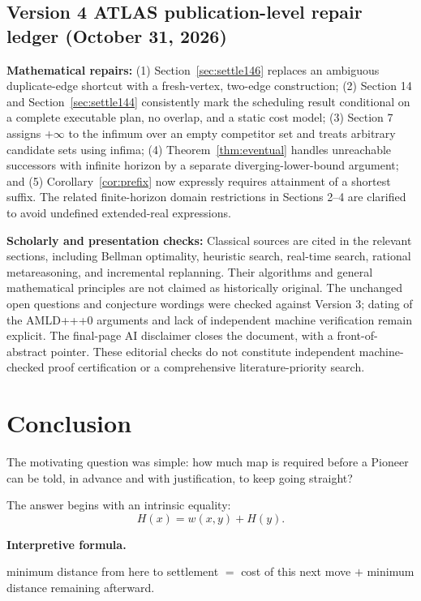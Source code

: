 \documentclass[11pt]{article}
\theoremstyle{definition}
\theoremstyle{remark}
\newenvironment{interpretiveformula}{%
  \begin{center}\begin{minipage}{0.92\linewidth}\small
  \textbf{Interpretive formula.}\ \raggedright}{\end{minipage}\end{center}}
\begin{document}
\subsection*{Version 4 ATLAS publication-level repair ledger (October 31, 2026)}
\noindent\textbf{Mathematical repairs:} (1) Section~\ref{sec:settle146} replaces an ambiguous duplicate-edge shortcut with a fresh-vertex, two-edge construction; (2) Section 14 and Section~\ref{sec:settle144} consistently mark the scheduling result conditional on a complete executable plan, no overlap, and a static cost model; (3) Section 7 assigns $+\infty$ to the infimum over an empty competitor set and treats arbitrary candidate sets using infima; (4) Theorem~\ref{thm:eventual} handles unreachable successors with infinite horizon by a separate diverging-lower-bound argument; and (5) Corollary~\ref{cor:prefix} now expressly requires attainment of a shortest suffix. The related finite-horizon domain restrictions in Sections 2--4 are clarified to avoid undefined extended-real expressions.\par
\noindent\textbf{Scholarly and presentation checks:} Classical sources are cited in the relevant sections, including Bellman optimality, heuristic search, real-time search, rational metareasoning, and incremental replanning. Their algorithms and general mathematical principles are not claimed as historically original. The unchanged open questions and conjecture wordings were checked against Version 3; dating of the AMLD+++0 arguments and lack of independent machine verification remain explicit. The final-page AI disclaimer closes the document, with a front-of-abstract pointer. These editorial checks do not constitute independent machine-checked proof certification or a comprehensive literature-priority search.\par

\section{Conclusion}
The motivating question was simple: how much map is required before a Pioneer can be told, in advance and with justification, to keep going straight?

The answer begins with an intrinsic equality:
\[
\boxed{H(x)=w(x,y)+H(y).}
\]

\begin{interpretiveformula}
minimum distance from here to settlement $=$ cost of this next move $+$ minimum distance remaining afterward.
\end{interpretiveformula}
\end{document}
